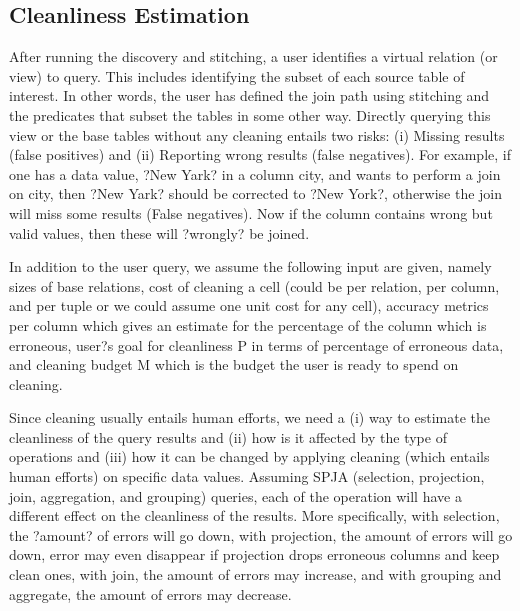 \subsection{Cleanliness Estimation}
\label{sec:cleanliness}

After running the  discovery and stitching, a user identifies a virtual relation (or view) to query.  This includes identifying the subset of each source table of interest.  In other words, the user has defined the join path using stitching and the predicates that subset the tables in some other way.   Directly querying this view or the base tables without any cleaning entails two risks: (i) Missing results (false positives) and (ii) Reporting wrong results (false negatives). For example,  if one has a data value, ?New Yark? in a column city, and wants to perform a join on city, then ?New Yark? should be corrected to ?New York?, otherwise the join will miss some results (False negatives). Now if the column contains wrong but valid values, then these will ?wrongly? be joined. 

In addition to the user query, we assume the following input are given, namely sizes of base relations, cost of cleaning a cell (could be per relation, per column, and per tuple or we could assume one unit cost for any cell),  accuracy metrics per column which gives an estimate for the percentage of the column which is erroneous,  user?s goal for cleanliness P in terms of percentage of erroneous data,  and cleaning budget M which is the budget the user is ready to spend on cleaning.

Since cleaning usually entails human efforts, we need a (i) way to estimate the cleanliness of the query results and (ii) how is it affected by the type of operations and (iii) how it can be changed by applying cleaning (which entails human efforts) on specific data values. Assuming SPJA (selection, projection, join, aggregation, and grouping) queries, each of the operation will have a different effect on the cleanliness of the results. More specifically,  with selection, the ?amount? of errors will go down, with projection,  the amount of errors will go down, error may even disappear if projection drops erroneous columns and keep clean ones, with join, the amount of errors may increase, and with grouping and aggregate, the amount of errors may decrease. 

